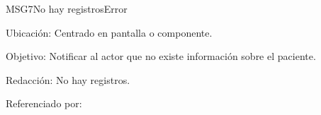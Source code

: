 \begin{mensaje}{MSG7}{No hay registros}{Error}
	\item[Ubicación:] Centrado en pantalla o componente.
	\item[Objetivo:] Notificar al actor que no existe información sobre el paciente.
	\item[Redacción:] No hay registros.
	\item[Referenciado por:] 
	
\end{mensaje}